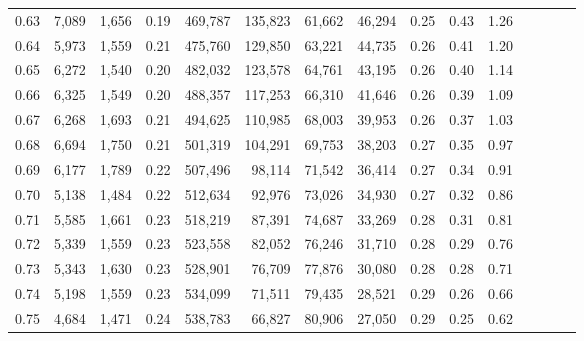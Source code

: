 \begin{tabular}{rrrcrrrrrrrrrrr}
0.63 &   7,089 &  1,656 &                                       0.19 &  469,787 &  135,823 &   61,662 &   46,294 &  0.25 &  0.43 &                         1.26 \\
0.64 &   5,973 &  1,559 &                                       0.21 &  475,760 &  129,850 &   63,221 &   44,735 &  0.26 &  0.41 &                         1.20 \\
0.65 &   6,272 &  1,540 &                                       0.20 &  482,032 &  123,578 &   64,761 &   43,195 &  0.26 &  0.40 &                         1.14 \\
0.66 &   6,325 &  1,549 &                                       0.20 &  488,357 &  117,253 &   66,310 &   41,646 &  0.26 &  0.39 &                         1.09 \\
0.67 &   6,268 &  1,693 &                                       0.21 &  494,625 &  110,985 &   68,003 &   39,953 &  0.26 &  0.37 &                         1.03 \\
0.68 &   6,694 &  1,750 &                                       0.21 &  501,319 &  104,291 &   69,753 &   38,203 &  0.27 &  0.35 &                         0.97 \\
0.69 &   6,177 &  1,789 &                                       0.22 &  507,496 &   98,114 &   71,542 &   36,414 &  0.27 &  0.34 &                         0.91 \\
0.70 &   5,138 &  1,484 &                                       0.22 &  512,634 &   92,976 &   73,026 &   34,930 &  0.27 &  0.32 &                         0.86 \\
0.71 &   5,585 &  1,661 &                                       0.23 &  518,219 &   87,391 &   74,687 &   33,269 &  0.28 &  0.31 &                         0.81 \\
0.72 &   5,339 &  1,559 &                                       0.23 &  523,558 &   82,052 &   76,246 &   31,710 &  0.28 &  0.29 &                         0.76 \\
0.73 &   5,343 &  1,630 &                                       0.23 &  528,901 &   76,709 &   77,876 &   30,080 &  0.28 &  0.28 &                         0.71 \\
0.74 &   5,198 &  1,559 &                                       0.23 &  534,099 &   71,511 &   79,435 &   28,521 &  0.29 &  0.26 &                         0.66 \\
0.75 &   4,684 &  1,471 &                                       0.24 &  538,783 &   66,827 &   80,906 &   27,050 &  0.29 &  0.25 &                         0.62 \\

\end{tabular}
